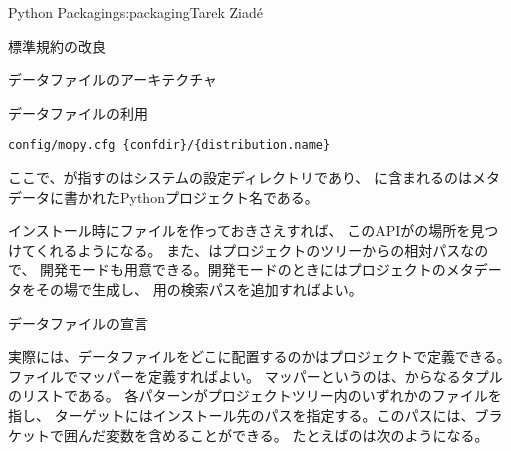 \begin{aosachapter}{Python Packaging}{s:packaging}{Tarek Ziad\'{e}}
\begin{aosasect1}{標準規約の改良}
\begin{aosasect2}{データファイルのアーキテクチャ}
\begin{aosasect3}{データファイルの利用}
\begin{verbatim}
config/mopy.cfg {confdir}/{distribution.name}
\end{verbatim}

\noindent
ここで、が指すのはシステムの設定ディレクトリであり、
に含まれるのはメタデータに書かれたPythonプロジェクト名である。


インストール時にファイルを作っておきさえすれば、
このAPIがの場所を見つけてくれるようになる。
また、はプロジェクトのツリーからの相対パスなので、
開発モードも用意できる。開発モードのときにはプロジェクトのメタデータをその場で生成し、
用の検索パスを追加すればよい。

\end{aosasect3}

\begin{aosasect3}{データファイルの宣言}

実際には、データファイルをどこに配置するのかはプロジェクトで定義できる。
ファイルでマッパーを定義すればよい。
マッパーというのは、からなるタプルのリストである。
各パターンがプロジェクトツリー内のいずれかのファイルを指し、
ターゲットにはインストール先のパスを指定する。このパスには、ブラケットで囲んだ変数を含めることができる。
たとえばのは次のようになる。


\end{aosasect3}
\end{aosasect2}
\end{aosasect1}
\end{aosachapter}
